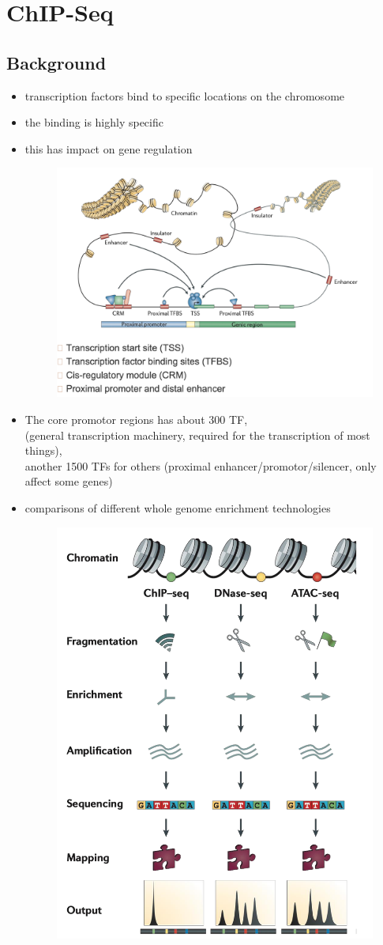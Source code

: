 \documentclass[font=12pt]{article}
\begin{document}
\section{ChIP-Seq}
\subsection{Background}
\begin{itemize}
	\item transcription factors bind to specific locations on the chromosome
	\item the binding is highly specific
	\item this has impact on gene regulation
	\begin{figure}[h!]
		\centering
		\includegraphics[width=0.6\linewidth]{TFillustration}
		\label{fig:tfillustration}
	\end{figure}
	\item The core promotor regions has about 300 TF, \\
	(general transcription machinery, required for the transcription of most things), \\
	another 1500 TFs for others (proximal enhancer/promotor/silencer, only affect some genes)
	\item comparisons of different whole genome enrichment technologies
	\begin{figure}[h!]
		\centering
		\includegraphics[width=0.4\linewidth]{genomewide_profiling_tech}
		\label{fig:genomewideprofilingtech}
	\end{figure}
	
\end{itemize}
\end{document}

